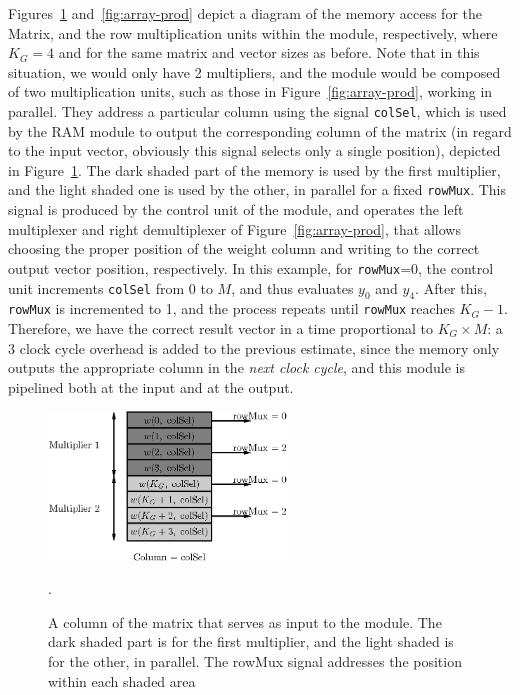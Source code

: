\documentclass[conference]{IEEEtran}
\begin{document}
Figures~\ref{fig:mem-arrayprod} and~\ref{fig:array-prod} depict a diagram of the memory access for the Matrix, and the row multiplication
units within the module, respectively, where $K_G = 4$ and for the same matrix and vector sizes as before. Note that in this situation,
we would only have 2 multipliers, and the module would be composed of two multiplication units, such as those in Figure~\ref{fig:array-prod},
working in parallel. They address a particular column using the signal \verb+colSel+, which is used by the RAM module to output the corresponding
column of the matrix (in regard to the input vector, obviously this signal selects only a single position), depicted in Figure~\ref{fig:mem-arrayprod}.
The dark shaded part of the memory is used by the first multiplier, and the light shaded one is used by the other, in parallel for a
fixed \verb+rowMux+. This signal is produced by the control unit of the module, and operates the left multiplexer and right demultiplexer
of Figure~\ref{fig:array-prod}, that allows choosing the proper position of the weight column and writing to the correct output vector position, respectively.
In this example, for \verb+rowMux+=0, the control unit increments \verb+colSel+ from 0 to $M$, and thus evaluates $y_0$ and $y_4$. After this, \verb+rowMux+
is incremented to 1, and the process repeats until \verb+rowMux+ reaches $K_G-1$. Therefore, we have the correct result vector in a time
proportional to $K_G \times M$: a 3 clock cycle overhead is added to the previous estimate, since the memory only outputs the appropriate column
in the \emph{next clock cycle}, and this module is pipelined both at the input and at the output.

\begin{figure}
    \centering
    \includegraphics[width=2.5in]{figures/mem-array-prod.eps}
    \caption{A column of the matrix that serves as input to the module. The dark shaded part is for the first multiplier, and the light shaded is for the other, in parallel. The rowMux signal addresses the position within each shaded area}.
    \label{fig:mem-arrayprod}
\end{figure}
\end{document}
